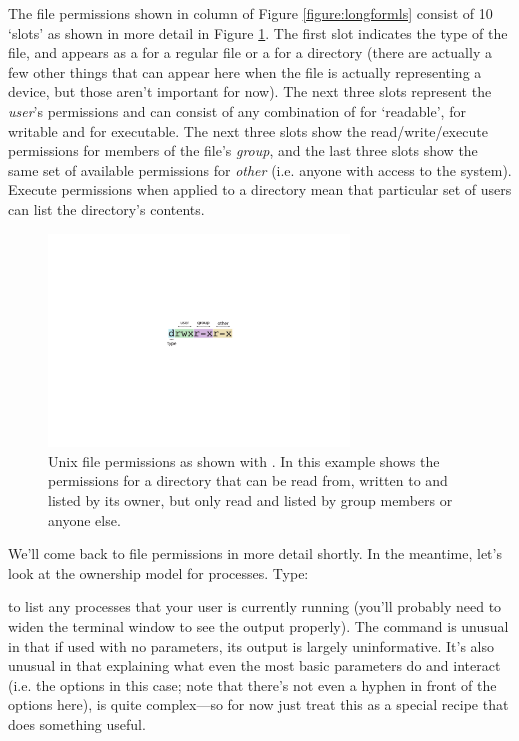 The file permissions shown in column \protect{} of Figure \ref{figure:longformls} consist of 10 `slots' as shown in more detail in Figure \ref{figure:fileperms}. The first slot indicates the type of the file, and appears as a \ttout{-} for a regular file or a  for a directory (there are actually a few other things that can appear here when the file is actually representing a device, but those aren't important for now). The next three slots represent the \textit{user}'s permissions and can consist of any combination of  for `readable',  for writable and  for executable. The next three slots show the read/write/execute permissions for members of the file's \textit{group}, and the last three slots show the same set of available permissions for \textit{other} (i.e. anyone with access to the system). Execute permissions when applied to a directory mean that particular set of users can list the directory's contents. 


\begin{figure}
\centerline{\includegraphics[width=8cm]{images/filepermissions}}
\caption{Unix file permissions as shown with . In this example shows the permissions for a directory that can be read from, written to and listed by its owner, but only read and listed by group members or anyone else.}\label{figure:fileperms}
\end{figure}


We'll come back to file permissions in more detail shortly. In the meantime, let's look at the ownership model for processes. Type:

to list any processes that your user is currently running (you'll probably need to widen the terminal window to see the output properly). The  command is unusual in that if used with no parameters, its output is largely uninformative. It's also unusual in that explaining what even the most basic parameters do and interact (i.e. the  options in this case; note that there's not even a hyphen in front of the options here), is quite complex---so for now just treat this as a special recipe that does something useful. 

